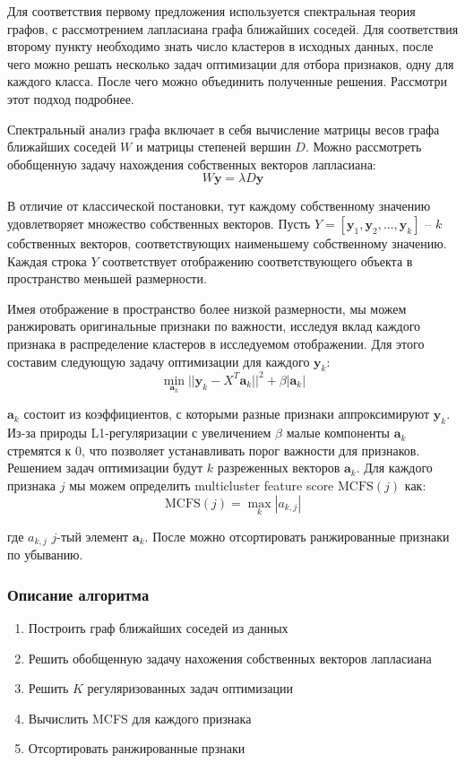 	Для соответствия первому предложения используется спектральная теория графов, с рассмотрением лапласиана графа ближайших соседей. Для соответствия второму пункту необходимо знать число кластеров в исходных данных, после чего можно решать несколько задач оптимизации для отбора признаков, одну для каждого класса. После чего можно объединить полученные решения. Рассмотри этот подход подробнее.

	Спектральный анализ графа включает в себя вычисление матрицы весов графа ближайших соседей $W$ и матрицы степеней вершин $D$. Можно рассмотреть обобщенную задачу нахождения собственных векторов лапласиана:
	\begin{equation}
		W \mathbf{y} = \lambda D \mathbf{y}
	\end{equation}

	 В отличие от классической постановки, тут каждому собственному значению удовлетворяет множество собственных векторов. Пусть 
	 $Y = [\mathbf{y}_1, \mathbf{y}_2,...,\mathbf{y}_k]$ -- $k$ 
	 собственных векторов, соответствующих наименьшему собственному значению. Каждая строка $Y$ соответствует отображению соответствующего объекта в пространство меньшей размерности. 

	 Имея отображение в пространство более низкой размерности, мы можем ранжировать оригинальные признаки по важности, исследуя вклад каждого признака в распределение кластеров в исследуемом отображении. Для этого составим следующую задачу оптимизации для каждого $\mathbf{y}_k$:
	 \begin{equation}
	 	\min_{\mathbf{a}_k} ||\mathbf{y}_k - X^T \mathbf{a}_k||^2 + \beta |\mathbf{a}_k|
	 \end{equation}

	 $\mathbf{a}_k$ состоит из коэффициентов, с которыми разные признаки аппроксимируют $\mathbf{y}_k$. Из-за природы L1-регуляризации с увеличением $\beta$ малые компоненты $\mathbf{a}_k$ стремятся к 0, что позволяет устанавливать порог важности для признаков. Решением задач оптимизации будут $k$ разреженных векторов $\mathbf{a}_k$. Для каждого признака $j$ мы можем определить multicluster feature score $\text{MCFS}(j)$ как:
	 \begin{equation}
	 	\text{MCFS}(j) = \max_k |a_{k,j}|
	 \end{equation}

	 где $a_{k,j}$ $j$-тый элемент $\mathbf{a}_k$. После можно отсортировать ранжированные признаки по убыванию.

	 \subsubsection{Описание алгоритма}
	 \begin{enumerate}
	 	\item Построить граф ближайших соседей из данных
	 	\item Решить обобщенную задачу нахожения собственных векторов лапласиана
	 	\item Решить $K$ регуляризованных задач оптимизации
	 	\item Вычислить MCFS для каждого признака
	 	\item Отсортировать ранжированные прзнаки
	 \end{enumerate}
